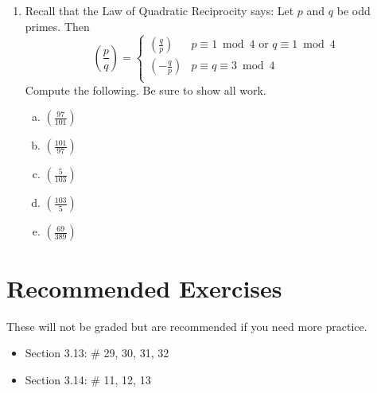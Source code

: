 \documentclass[12pt]{amsart}
\theoremstyle{plain}
\theoremstyle{definition}
\begin{document}
\begin{enumerate}[1.]
\begin{enumerate}[a.]
	\end{enumerate}
	\item Recall that the Law of Quadratic Reciprocity says:  Let $p$ and $q$ be odd primes.  Then
		\[ \left( \frac{p}{q}\right) = \begin{cases} 
      		\left( \frac{q}{p}\right) & p \equiv 1 \bmod 4 \text{ or } q \equiv 1 \bmod 4\\
      		\left( -\frac{q}{p}\right) & p \equiv q \equiv 3 \bmod 4\\
  		 \end{cases}
		\]
		Compute the following.  Be sure to show all work.
		\begin{enumerate}[a.]
		\item  $\left(\frac{97}{101}\right)$
		\begin{framed}
		\vspace{1in}
		\end{framed}
		\item $\left(\frac{101}{97}\right)$
		\begin{framed}
		\vspace{1in}
		\end{framed}
		\item $\left(\frac{5}{103}\right)$
		\begin{framed}
		\vspace{1in}
		\end{framed}
		\item $\left(\frac{103}{5}\right)$
		\begin{framed}
		\vspace{1in}
		\end{framed}
		\item $\left(\frac{69}{389}\right)$
		\begin{framed}
		\vspace{1in}
		\end{framed}
		\end{enumerate}
\end{enumerate}


\section{Recommended Exercises}
\noindent These will not be graded but are recommended if you need more practice.
\begin{itemize}
	\item Section 3.13: \# 29, 30, 31, 32
	\item Section 3.14: \# 11, 12, 13
\end{itemize}
	
\end{document}
